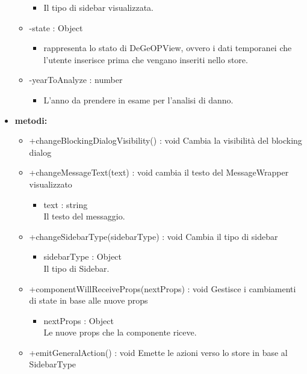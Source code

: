 \begin{itemize}
\begin{itemize}
\begin{itemize}
			\item Il tipo di sidebar visualizzata.\end{itemize}
		\item -state : Object\begin{itemize}
			\item rappresenta lo stato di DeGeOPView, ovvero i dati temporanei che l'utente inserisce prima che vengano inseriti nello store.\end{itemize}
		\item -yearToAnalyze : number\begin{itemize}
			\item L'anno da prendere in esame per l'analisi di danno.\end{itemize}
	\end{itemize}
	\item \textbf{metodi:}
	\begin{itemize}
		\item +changeBlockingDialogVisibility() : void\newline
		Cambia la visibilità del blocking dialog
		\item +changeMessageText(text) : void\newline
		cambia il testo del MessageWrapper visualizzato
		\begin{itemize}
			\item text : string\\
			Il testo del messaggio.
		\end{itemize}
		\item +changeSidebarType(sidebarType) : void\newline
		Cambia il tipo di sidebar
		\begin{itemize}
			\item sidebarType : Object\\
			Il tipo di Sidebar.
		\end{itemize}
		\item +componentWillReceiveProps(nextProps) : void\newline
		Gestisce i cambiamenti di state in base alle nuove props
		\begin{itemize}
			\item nextProps : Object\\
			Le nuove props che la componente riceve.
		\end{itemize}
		\item +emitGeneralAction() : void\newline
		Emette le azioni verso lo store in base al SidebarType

\end{itemize}
\end{itemize}
